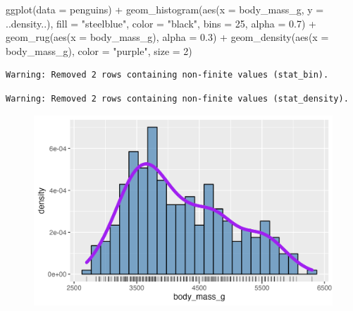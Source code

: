 \documentclass[
  letterpaper,
  DIV=11,
  numbers=noendperiod]{scrreprt}
\newenvironment{Shaded}{\begin{snugshade}}{\end{snugshade}}
\newcommand{\AttributeTok}[1]{\textcolor[rgb]{0.40,0.45,0.13}{#1}}
\newcommand{\DecValTok}[1]{\textcolor[rgb]{0.68,0.00,0.00}{#1}}
\newcommand{\FloatTok}[1]{\textcolor[rgb]{0.68,0.00,0.00}{#1}}
\newcommand{\FunctionTok}[1]{\textcolor[rgb]{0.28,0.35,0.67}{#1}}
\newcommand{\NormalTok}[1]{\textcolor[rgb]{0.00,0.23,0.31}{#1}}
\newcommand{\SpecialCharTok}[1]{\textcolor[rgb]{0.37,0.37,0.37}{#1}}
\newcommand{\StringTok}[1]{\textcolor[rgb]{0.13,0.47,0.30}{#1}}
\begin{document}
\begin{Shaded}
\begin{Highlighting}[]
\FunctionTok{ggplot}\NormalTok{(}\AttributeTok{data =}\NormalTok{ penguins) }\SpecialCharTok{+}
  \FunctionTok{geom\_histogram}\NormalTok{(}\FunctionTok{aes}\NormalTok{(}\AttributeTok{x =}\NormalTok{ body\_mass\_g, }\AttributeTok{y =}\NormalTok{ ..density..),}
                 \AttributeTok{fill =} \StringTok{"steelblue"}\NormalTok{, }\AttributeTok{color =} \StringTok{"black"}\NormalTok{,}
                 \AttributeTok{bins =} \DecValTok{25}\NormalTok{, }\AttributeTok{alpha =} \FloatTok{0.7}\NormalTok{) }\SpecialCharTok{+}
  \FunctionTok{geom\_rug}\NormalTok{(}\FunctionTok{aes}\NormalTok{(}\AttributeTok{x =}\NormalTok{ body\_mass\_g),}
           \AttributeTok{alpha =} \FloatTok{0.3}\NormalTok{) }\SpecialCharTok{+}
  \FunctionTok{geom\_density}\NormalTok{(}\FunctionTok{aes}\NormalTok{(}\AttributeTok{x =}\NormalTok{ body\_mass\_g),}
               \AttributeTok{color =} \StringTok{"purple"}\NormalTok{, }\AttributeTok{size =} \DecValTok{2}\NormalTok{)}
\end{Highlighting}
\end{Shaded}

\begin{verbatim}
Warning: Removed 2 rows containing non-finite values (stat_bin).
\end{verbatim}

\begin{verbatim}
Warning: Removed 2 rows containing non-finite values (stat_density).
\end{verbatim}

\begin{figure}[H]

{\centering \includegraphics{./03-visualization_files/figure-pdf/unnamed-chunk-25-1.png}

}

\end{figure}
\end{document}
